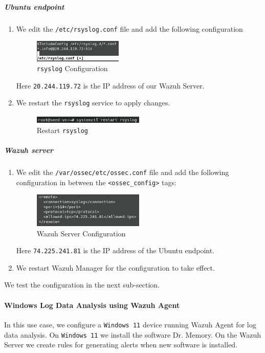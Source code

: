 \subparagraph{Ubuntu endpoint}
\begin{enumerate}
    \item We edit the \texttt{/etc/rsyslog.conf} file and add the following configuration
    \begin{figure} [H]
    \centering
    \includegraphics[width=0.4\textwidth]{images/log-data/1.png}
    \caption{\texttt{rsyslog} Configuration}
    \end{figure}
    Here \texttt{20.244.119.72} is the IP address of our Wazuh Server.
    \item We restart the \texttt{rsyslog} service to apply changes.
    \begin{figure} [H]
    \centering
    \includegraphics[width=0.5\textwidth]{images/log-data/2.png}
    \caption{Restart \texttt{rsyslog}}
    \end{figure}
\end{enumerate}

\subparagraph{Wazuh server}
\begin{enumerate}
    \item We edit the \texttt{/var/ossec/etc/ossec.conf} file and add the following configuration in between the \texttt{<ossec\_config>} tags:
    \begin{figure} [H]
    \centering
    \includegraphics[width=0.5\textwidth]{images/log-data/3.png}
    \caption{Wazuh Server Configuration}
    \end{figure}
    Here \texttt{74.225.241.81} is the IP address of the Ubuntu endpoint.
    
    \item We restart Wazuh Manager for the configuration to take effect.
\end{enumerate}

We test the configuration in the next sub-section. 

\paragraph{Windows Log Data Analysis using Wazuh Agent}
In this use case, we configure a \texttt{Windows 11} device running Wazuh Agent for log data analysis. On \texttt{Windows 11} we install the software Dr. Memory. On the Wazuh Server we create rules for generating alerts when new software is installed.

